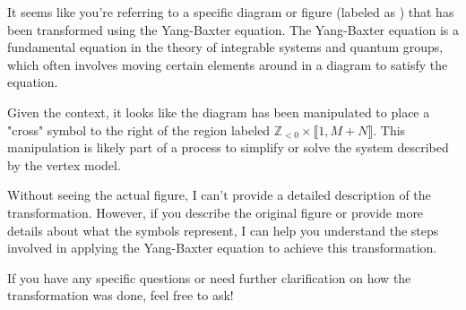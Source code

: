 It seems like you're referring to a specific diagram or figure (labeled as ) that has been transformed using the Yang-Baxter equation. The Yang-Baxter equation is a fundamental equation in the theory of integrable systems and quantum groups, which often involves moving certain elements around in a diagram to satisfy the equation.

Given the context, it looks like the diagram has been manipulated to place a "cross" symbol to the right of the region labeled \(\mathbb{Z}_{< 0} \times \llbracket 1, M + N \rrbracket\). This manipulation is likely part of a process to simplify or solve the system described by the vertex model.

Without seeing the actual figure, I can't provide a detailed description of the transformation. However, if you describe the original figure or provide more details about what the symbols represent, I can help you understand the steps involved in applying the Yang-Baxter equation to achieve this transformation.

If you have any specific questions or need further clarification on how the transformation was done, feel free to ask!